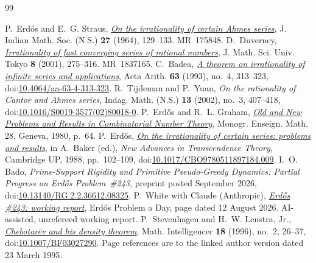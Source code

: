 \documentclass[11pt]{article}
\begin{document}
\begin{thebibliography}{99}
\small
\raggedright
\setlength{\itemsep}{1pt}
 P.~Erd\H{o}s and E.~G. Straus,
  \href{https://users.renyi.hu/~p_erdos/1964-19.pdf}{\emph{On the irrationality
  of certain Ahmes series}},
  J. Indian Math. Soc. (N.S.) \textbf{27} (1964), 129--133. MR~175848.
 D.~Duverney,
  \href{https://www.ms.u-tokyo.ac.jp/journal/pdf/jms080206.pdf}
  {\emph{Irrationality of fast converging series of rational numbers}},
  J. Math. Sci. Univ. Tokyo \textbf{8} (2001), 275--316. MR~1837165.
 C.~Badea,
  \href{https://matwbn.icm.edu.pl/ksiazki/aa/aa63/aa6342.pdf}{\emph{A theorem
  on irrationality of infinite series and applications}}, Acta Arith.
  \textbf{63} (1993), no.~4, 313--323,
  doi:\href{https://doi.org/10.4064/aa-63-4-313-323}{10.4064/aa-63-4-313-323}.
 R.~Tijdeman and P.~Yuan,
  \emph{On the rationality of Cantor and Ahmes series},
  Indag. Math. (N.S.) \textbf{13} (2002), no.~3, 407--418,
  doi:\href{https://doi.org/10.1016/S0019-3577(02)80018-0}{10.1016/S0019-3577(02)80018-0}.
 P.~Erd\H{o}s and R.~L. Graham,
  \href{https://mathweb.ucsd.edu/~ronspubs/80_11_number_theory.pdf}{\emph{Old
  and New Problems and Results in Combinatorial Number Theory}},
  Monogr. Enseign. Math. 28, Geneva, 1980, p.~64.
 P.~Erd\H{o}s,
  \href{https://users.renyi.hu/~p_erdos/1988-22.pdf}{\emph{On the irrationality
  of certain series: problems and results}}, in A.~Baker (ed.), \emph{New
  Advances in Transcendence Theory}, Cambridge UP, 1988, pp.~102--109,
  doi:\href{https://doi.org/10.1017/CBO9780511897184.009}{10.1017/CBO9780511897184.009}.
 I.~O. Bado,
  \emph{Prime-Support Rigidity and Primitive Pseudo-Greedy Dynamics:
  Partial Progress on Erd\H{o}s Problem~\#243}, preprint posted September 2026,
  doi:\href{https://doi.org/10.13140/RG.2.2.36612.08325}
  {10.13140/RG.2.2.36612.08325}.
 P.~White with Claude (Anthropic),
  \href{https://erdosproblemaday.com/report/243}{\emph{Erd\H{o}s \#243:
  working report}}, Erd\H{o}s Problem a Day, page dated 12 August 2026.
  AI-assisted, unrefereed working report.
 P.~Stevenhagen and H.~W. Lenstra, Jr.,
  \href{https://pub.math.leidenuniv.nl/~lenstrahw/PUBLICATIONS/1994c/art.pdf}
  {\emph{Chebotar\"ev and his density theorem}}, Math. Intelligencer
  \textbf{18} (1996), no.~2, 26--37,
  doi:\href{https://doi.org/10.1007/BF03027290}{10.1007/BF03027290}.
  Page references are to the linked author version dated 23 March 1995.

\end{thebibliography}
\end{document}
